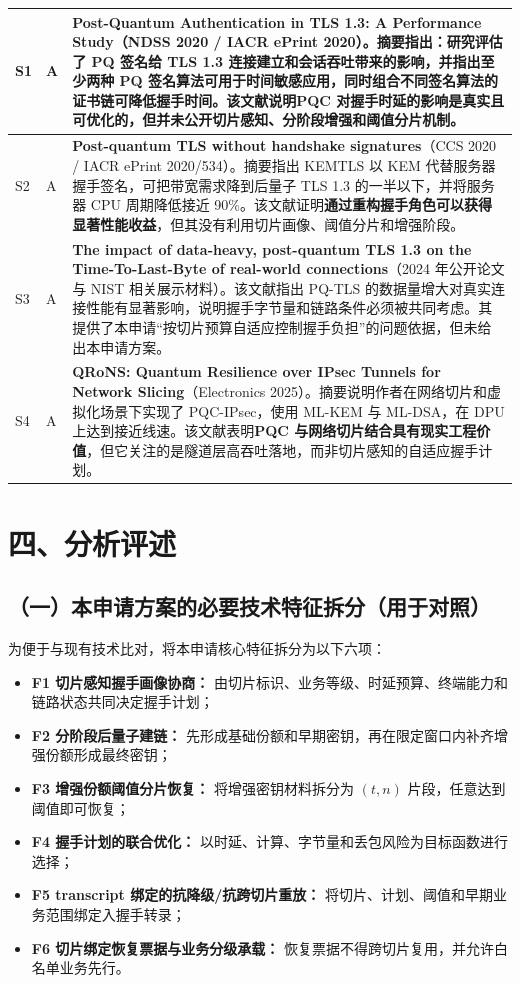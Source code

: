 \documentclass[12pt,a4paper]{article}
\begin{document}
\begin{longtable}{|p{1.2cm}|p{1.6cm}|p{11cm}|}
\hline
S1 & A & \textbf{Post-Quantum Authentication in TLS 1.3: A Performance Study}（NDSS 2020 / IACR ePrint 2020）。摘要指出：研究评估了 PQ 签名给 TLS 1.3 连接建立和会话吞吐带来的影响，并指出至少两种 PQ 签名算法可用于时间敏感应用，同时组合不同签名算法的证书链可降低握手时间。该文献说明\textbf{PQC 对握手时延的影响是真实且可优化的}，但并未公开切片感知、分阶段增强和阈值分片机制。 \\
\hline
S2 & A & \textbf{Post-quantum TLS without handshake signatures}（CCS 2020 / IACR ePrint 2020/534）。摘要指出 KEMTLS 以 KEM 代替服务器握手签名，可把带宽需求降到后量子 TLS 1.3 的一半以下，并将服务器 CPU 周期降低接近 90\%。该文献证明\textbf{通过重构握手角色可以获得显著性能收益}，但其没有利用切片画像、阈值分片和增强阶段。 \\
\hline
S3 & A & \textbf{The impact of data-heavy, post-quantum TLS 1.3 on the Time-To-Last-Byte of real-world connections}（2024 年公开论文与 NIST 相关展示材料）。该文献指出 PQ-TLS 的数据量增大对真实连接性能有显著影响，说明握手字节量和链路条件必须被共同考虑。其提供了本申请“按切片预算自适应控制握手负担”的问题依据，但未给出本申请方案。 \\
\hline
S4 & A & \textbf{QRoNS: Quantum Resilience over IPsec Tunnels for Network Slicing}（Electronics 2025）。摘要说明作者在网络切片和虚拟化场景下实现了 PQC-IPsec，使用 ML-KEM 与 ML-DSA，在 DPU 上达到接近线速。该文献表明\textbf{PQC 与网络切片结合具有现实工程价值}，但它关注的是隧道层高吞吐落地，而非切片感知的自适应握手计划。 \\
\hline
\end{longtable}
\endgroup

\section*{四、分析评述}

\subsection*{（一）本申请方案的必要技术特征拆分（用于对照）}

为便于与现有技术比对，将本申请核心特征拆分为以下六项：

\begin{itemize}[leftmargin=2em]
    \item \textbf{F1 切片感知握手画像协商：} 由切片标识、业务等级、时延预算、终端能力和链路状态共同决定握手计划；
    \item \textbf{F2 分阶段后量子建链：} 先形成基础份额和早期密钥，再在限定窗口内补齐增强份额形成最终密钥；
    \item \textbf{F3 增强份额阈值分片恢复：} 将增强密钥材料拆分为 $(t,n)$ 片段，任意达到阈值即可恢复；
    \item \textbf{F4 握手计划的联合优化：} 以时延、计算、字节量和丢包风险为目标函数进行选择；
    \item \textbf{F5 transcript 绑定的抗降级/抗跨切片重放：} 将切片、计划、阈值和早期业务范围绑定入握手转录；
    \item \textbf{F6 切片绑定恢复票据与业务分级承载：} 恢复票据不得跨切片复用，并允许白名单业务先行。
\end{itemize}
\end{document}
